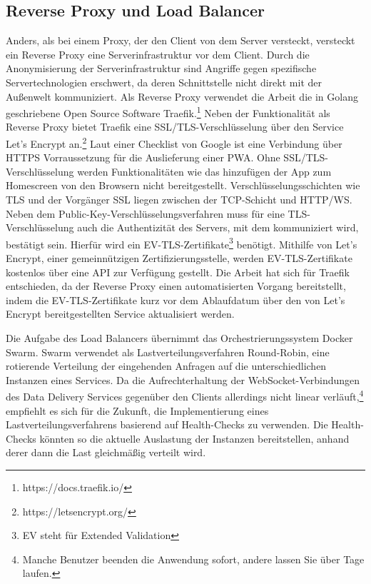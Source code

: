 \subsection{Reverse Proxy und Load Balancer}
\label{subsec:reverseproxyundloadbalancer}
Anders, als bei einem Proxy, der den Client von dem Server versteckt, versteckt ein Reverse Proxy
eine Serverinfrastruktur vor dem Client. Durch die Anonymisierung der Serverinfrastruktur
sind Angriffe gegen spezifische Servertechnologien erschwert, da deren Schnittstelle
nicht direkt mit der Außenwelt kommuniziert. Als Reverse Proxy verwendet die Arbeit
die in Golang geschriebene Open Source Software Traefik.\footnote{https://docs.traefik.io/}
Neben der Funktionalität als Reverse Proxy bietet Traefik eine
SSL/TLS-Verschlüsselung über den Service Let's Encrypt an.\footnote{https://letsencrypt.org/}
Laut einer Checklist von Google ist eine Verbindung über HTTPS
Vorraussetzung für die Auslieferung einer PWA.\cite{GooglePWAChecklist}
Ohne SSL/TLS-Verschlüsselung werden Funktionalitäten wie das hinzufügen der App zum Homescreen
von den Browsern nicht bereitgestellt. Verschlüsselungsschichten wie TLS und der Vorgänger
SSL liegen zwischen der TCP-Schicht und HTTP/WS. Neben dem Public-Key-Verschlüsselungsverfahren
muss für eine TLS-Verschlüsselung auch die Authentizität des Servers, mit dem kommuniziert wird,
bestätigt sein. Hierfür wird ein EV-TLS-Zertifikate\footnote{EV steht für Extended Validation} benötigt.
Mithilfe von Let's Encrypt, einer gemeinnützigen Zertifizierungsstelle, werden EV-TLS-Zertifikate
kostenlos über eine API zur Verfügung gestellt. Die Arbeit hat sich für Traefik entschieden,
da der Reverse Proxy einen automatisierten Vorgang bereitstellt, indem die EV-TLS-Zertifikate
kurz vor dem Ablaufdatum über den von Let's Encrypt bereitgestellten Service aktualisiert werden.

Die Aufgabe des Load Balancers übernimmt das Orchestrierungssystem Docker Swarm. Swarm verwendet
als Lastverteilungsverfahren Round-Robin, eine rotierende Verteilung der eingehenden Anfragen auf
die unterschiedlichen Instanzen eines Services.\cite{CloudflareRoundRobinDNS}
Da die Aufrechterhaltung der WebSocket-Verbindungen des Data Delivery Services gegenüber
den Clients allerdings nicht linear verläuft,\footnote{Manche Benutzer beenden die Anwendung sofort, andere lassen Sie über Tage laufen.}
empfiehlt es sich für die Zukunft, die Implementierung eines Lastverteilungsverfahrens
basierend auf Health-Checks zu verwenden. Die Health-Checks könnten so die aktuelle
Auslastung der Instanzen bereitstellen, anhand derer dann die Last gleichmäßig verteilt wird.

